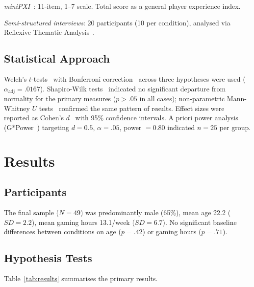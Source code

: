 \documentclass[conference]{IEEEtran}
\begin{document}
\textit{miniPXI}~\cite{vornhagen2022minipxi}: 11-item, 1--7 scale. Total score as a general player experience index.

\textit{Semi-structured interviews}: 20 participants (10 per condition), analysed via Reflexive Thematic Analysis~\cite{braun2022thematic}.

\subsection{Statistical Approach}

Welch's $t$-tests~\cite{welch1947generalization} with Bonferroni correction~\cite{bonferroni1936teoria} across three hypotheses were used ($\alpha_{\text{adj}} = .0167$). Shapiro-Wilk tests~\cite{shapiro1965analysis} indicated no significant departure from normality for the primary measures ($p > .05$ in all cases); non-parametric Mann-Whitney $U$ tests~\cite{mann1947test} confirmed the same pattern of results. Effect sizes were reported as Cohen's $d$~\cite{cohen1988statistical} with 95\% confidence intervals. A priori power analysis (G*Power~\cite{faul2007gpower}) targeting $d = 0.5$, $\alpha = .05$, power $= 0.80$ indicated $n = 25$ per group.

\section{Results}

\subsection{Participants}

The final sample ($N = 49$) was predominantly male (65\%), mean age 22.2 ($SD = 2.2$), mean gaming hours 13.1/week ($SD = 6.7$). No significant baseline differences between conditions on age ($p = .42$) or gaming hours ($p = .71$).

\subsection{Hypothesis Tests}

Table~\ref{tab:results} summarises the primary results.
\end{document}

